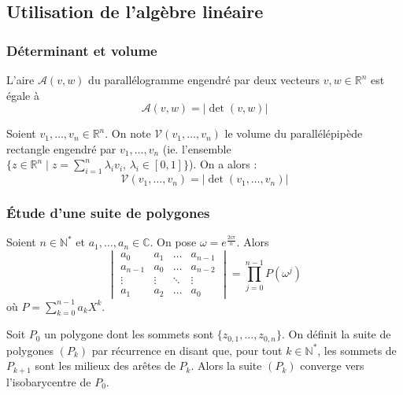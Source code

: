 	\subsection{Utilisation de l'algèbre linéaire}
	
	\subsubsection{Déterminant et volume}
	
	
	\begin{theorem}
		L'aire $\mathcal{A}(v,w)$ du parallélogramme engendré par deux vecteurs $v, w \in \mathbb{R}^n$ est égale à
		\[ \mathcal{A}(v,w) = \vert \det(v,w) \vert \]
	\end{theorem}
	
	\begin{corollary}
		Soient $v_1, \dots, v_n \in \mathbb{R}^n$. On note $\mathcal{V}(v_1, \dots, v_n)$ le volume du parallélépipède rectangle engendré par $v_1, \dots, v_n$ (ie. l'ensemble $\{ z \in \mathbb{R}^n \mid z = \sum_{i=1}^n \lambda_i v_i, \, \lambda_i \in [0,1] \}$). On a alors :
		\[ \mathcal{V}(v_1, \dots, v_n) = \vert \det(v_1, \dots, v_n) \vert \]
	\end{corollary}
	
	\newpage
	
	\subsubsection{Étude d'une suite de polygones}
	
	
	\begin{proposition}
		Soient $n \in \mathbb{N}^*$ et $a_1, \dots, a_n \in \mathbb{C}$. On pose $\omega = e^{\frac{2i\pi}{n}}$. Alors
		\[ \begin{vmatrix} a_0 & a_1 & \dots & a_{n-1} \\ a_{n-1} & a_0 & \dots & a_{n-2}\\ \vdots & \vdots & \ddots & \vdots \\ a_1 & a_2 & \dots & a_0 \end{vmatrix} = \prod_{j=0}^{n-1} P(\omega^j) \]
		où $P = \sum_{k=0}^{n-1} a_k X^k$.
	\end{proposition}
	
	
	\begin{application}
		Soit $P_0$ un polygone dont les sommets sont $\{ z_{0,1}, \dots, z_{0,n} \}$. On définit la suite de polygones $(P_k)$ par récurrence en disant que, pour tout $k \in \mathbb{N}^*$, les sommets de $P_{k+1}$ sont les milieux des arêtes de $P_k$.
		\newpar
		Alors la suite $(P_k)$ converge vers l'isobarycentre de $P_0$.
	\end{application}
	
